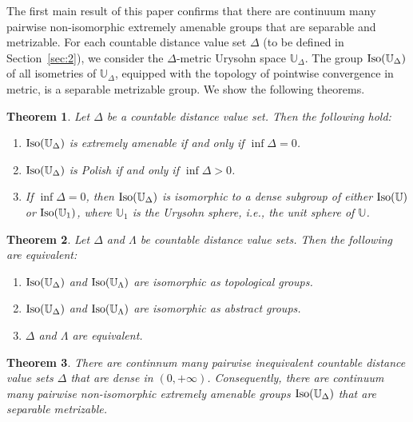 \documentclass{amsart}
\newtheorem{theorem}{Theorem}[section]
\theoremstyle{definition}
\theoremstyle{remark}
\begin{document}
The first main result of this paper confirms that there are continuum many pairwise non-isomorphic extremely amenable groups that are separable and metrizable. For each countable distance value set $\Delta$ (to be defined in Section~\ref{sec:2}), we consider the $\Delta$-metric Urysohn space $\mathbb{U}_\Delta$. The group $\mbox{\rm Iso}(\mathbb{U}_\Delta)$ of all isometries of $\mathbb{U}_\Delta$, equipped with the topology of pointwise convergence in metric, is a separable metrizable group. We show the following theorems.

\begin{theorem}\label{thm:main1} Let $\Delta$ be a countable distance value set. Then the following hold:
\begin{enumerate}
\item[\rm (1)] $\mbox{\rm Iso}(\mathbb{U}_\Delta)$ is extremely amenable if and only if $\inf\Delta=0$.
\item[\rm (2)] $\mbox{\rm Iso}(\mathbb{U}_\Delta)$ is Polish if and only if $\inf\Delta>0$.
\item[\rm (3)] If $\inf\Delta=0$, then $\mbox{\rm Iso}(\mathbb{U}_\Delta)$ is isomorphic to a dense subgroup of either $\mbox{\rm Iso}(\mathbb{U})$ or $\mbox{\rm Iso}(\mathbb{U}_1)$, where $\mathbb{U}_1$ is the Urysohn sphere, i.e., the unit sphere of $\mathbb{U}$.
\end{enumerate}
\end{theorem}

\begin{theorem}\label{thm:main2} Let $\Delta$ and $\Lambda$ be countable distance value sets. Then the following are equivalent:
\begin{enumerate}
\item[\rm (i)] $\mbox{\rm Iso}(\mathbb{U}_\Delta)$ and $\mbox{\rm Iso}(\mathbb{U}_\Lambda)$ are isomorphic as topological groups.
\item[\rm (ii)] $\mbox{\rm Iso}(\mathbb{U}_\Delta)$ and $\mbox{\rm Iso}(\mathbb{U}_\Lambda)$ are isomorphic as abstract groups.
\item[\rm (iii)] $\Delta$ and $\Lambda$ are equivalent.
\end{enumerate}
\end{theorem}


\begin{theorem}\label{thm:main3} There are continnum many pairwise inequivalent countable distance value sets $\Delta$ that are dense in $(0,+\infty)$. Consequently, there are continuum many pairwise non-isomorphic extremely amenable groups $\mbox{\rm Iso}(\mathbb{U}_\Delta)$ that are separable metrizable.
\end{theorem}
\end{document}
